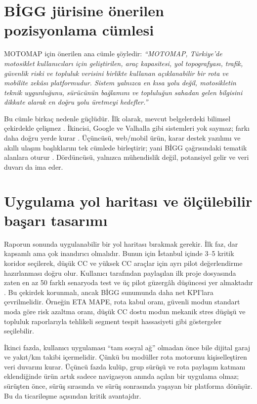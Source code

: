\documentclass[11pt,a4paper]{article}
\begin{document}
\section{BİGG jürisine önerilen pozisyonlama cümlesi}

MOTOMAP için önerilen ana cümle şöyledir: \emph{``MOTOMAP, Türkiye'de motosiklet kullanıcıları için geliştirilen, araç kapasitesi, yol topografyası, trafik, güvenlik riski ve topluluk verisini birlikte kullanan açıklanabilir bir rota ve mobilite zekâsı platformudur. Sistem yalnızca en kısa yolu değil, motosikletin teknik uygunluğunu, sürücünün bağlamını ve topluluğun sahadan gelen bilgisini dikkate alarak en doğru yolu üretmeyi hedefler.''}

Bu cümle birkaç nedenle güçlüdür. İlk olarak, mevcut belgelerdeki bilimsel çekirdekle çelişmez \cite{u1,u2}. İkincisi, Google ve Valhalla gibi sistemleri yok saymaz; farkı daha doğru yerde kurar \cite{o1,o7}. Üçüncüsü, web/mobil ürün, karar destek yazılımı ve akıllı ulaşım başlıklarını tek cümlede birleştirir; yani BİGG çağrısındaki tematik alanlara oturur \cite{u3}. Dördüncüsü, yalnızca mühendislik değil, potansiyel gelir ve veri duvarı da ima eder.

\section{Uygulama yol haritası ve ölçülebilir başarı tasarımı}

Raporun sonunda uygulanabilir bir yol haritası bırakmak gerekir. İlk faz, dar kapsamlı ama çok inandırıcı olmalıdır. Bunun için İstanbul içinde 3--5 kritik koridor seçilerek, düşük CC ve yüksek CC araçlar için ayrı pilot değerlendirme hazırlanması doğru olur. Kullanıcı tarafından paylaşılan ilk proje dosyasında zaten en az 50 farklı senaryoda test ve üç pilot güzergâh düşüncesi yer almaktadır \cite{u1}. Bu çekirdek korunmalı, ancak BİGG sunumunda daha net KPI'lara çevrilmelidir. Örneğin ETA MAPE, rota kabul oranı, güvenli modun standart moda göre risk azaltma oranı, düşük CC dostu modun mekanik stres düşüşü ve topluluk raporlarıyla tehlikeli segment tespit hassasiyeti gibi göstergeler seçilebilir.

İkinci fazda, kullanıcı uygulaması ``tam sosyal ağ'' olmadan önce bile dijital garaj ve yakıt/km takibi içermelidir. Çünkü bu modüller rota motorunu kişiselleştiren veri duvarını kurar. Üçüncü fazda kulüp, grup sürüşü ve rota paylaşım katmanı eklendiğinde ürün artık sadece navigasyon anında açılan bir uygulama olmaz; sürüşten önce, sürüş sırasında ve sürüş sonrasında yaşayan bir platforma dönüşür. Bu da ticarileşme açısından kritik avantajdır.
\end{document}
